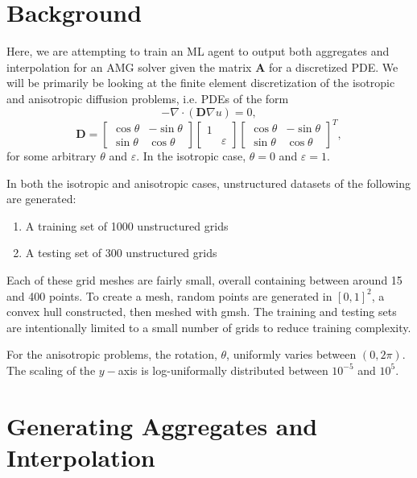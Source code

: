 \documentclass{article}
\newcommand{\mat}[1]{\bm{{#1}}}
\newcommand{\grad}{\nabla}
\begin{document}
\section{Background}
Here, we are attempting to train an ML agent to output both aggregates and interpolation for an AMG solver given the matrix $\mat{A}$ for a discretized PDE.  We will be primarily be looking at the finite element discretization of the isotropic and anisotropic diffusion problems, i.e. PDEs of the form
\begin{equation}
  -\grad \cdot \left(\mat{D} \grad u\right) = 0,
\end{equation}
\begin{equation}
  \mat{D} = \begin{bmatrix} \cos \theta & -\sin \theta \\ \sin \theta & \cos \theta \end{bmatrix} \begin{bmatrix} 1 & \\ & \varepsilon \end{bmatrix} \begin{bmatrix} \cos \theta & -\sin \theta \\ \sin \theta & \cos \theta \end{bmatrix}^T,
\end{equation}
for some arbitrary $\theta$ and $\varepsilon$.  In the isotropic case, $\theta=0$ and $\varepsilon=1$.

In both the isotropic and anisotropic cases, unstructured datasets of the following are generated:
\begin{enumerate}
\item A training set of 1000 unstructured grids
\item A testing set of 300 unstructured grids
\end{enumerate}
Each of these grid meshes are fairly small, overall containing between around 15 and 400 points.  To create a mesh, random points are generated in $\left[0,1\right]^2$, a convex hull constructed, then meshed with gmsh\cite{gmsh}.  The training and testing sets are intentionally limited to a small number of grids to reduce training complexity.

For the anisotropic problems, the rotation, $\theta$, uniformly varies between $\left(0, 2\pi\right)$.  The scaling of the $y-$axis is log-uniformally distributed between $10^{-5}$ and $10^5$.
\section{Generating Aggregates and Interpolation}
\end{document}
